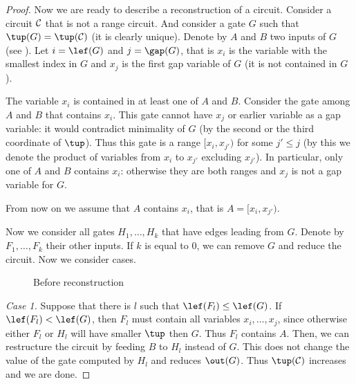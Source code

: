 \begin{proof}[Proof]
    Now we are ready to describe a reconstruction of a circuit. Consider a circuit ${\cal C}$ that is not a range circuit. And consider a gate $G$ such that $\tup(G)=\tup({\cal C})$ (it is clearly unique). Denote by $A$ and $B$ two inputs of $G$ (see ). Let $i=\lef(G)$ and $j=\gap(G)$, that is $x_i$ is the variable with the smallest index in $G$ and $x_j$ is the first gap variable of $G$ (it is not contained in $G$).

    The variable $x_i$ is contained in at least one of $A$ and $B$. Consider the gate among $A$ and $B$ that contains $x_i$. This gate cannot have $x_j$ or earlier variable as a gap variable: it would contradict minimality of $G$ (by the second or the third coordinate of $\tup$). Thus this gate is a range $[x_i,x_{j'})$ for some $j'\leq j$ (by this we denote the product of variables from $x_i$ to $x_{j'}$ excluding $x_{j'}$). In particular, only one of $A$ and $B$ contains $x_i$: otherwise they are both ranges and $x_j$ is not a gap variable for $G$.

    From now on we assume that $A$ contains $x_i$, that is $A=[x_i,x_{j'})$.

    Now we consider all gates $H_1,\ldots, H_k$ that have edges leading from $G$. Denote by $F_1,\ldots, F_k$ their other inputs. If $k$ is equal to $0$, we can remove $G$ and reduce the circuit. Now we consider cases.

    \begin{figure}[ht]
        \begin{center}
        \end{center}
        \caption{Before reconstruction} \label{fig:before}
    \end{figure}

    \emph{Case 1.} Suppose that there is $l$ such that $\lef(F_l) \leq \lef(G)$. If $\lef(F_l) < \lef(G)$, then $F_l$ must contain all variables $x_i, \ldots, x_j$, since otherwise either $F_l$ or $H_l$ will have smaller $\tup$ then $G$. Thus $F_l$ contains $A$. Then, we can restructure the circuit by feeding $B$ to $H_l$ instead of $G$. This does not change the value of the gate computed by $H_l$ and reduces $\out(G)$. Thus $\tup({\cal C})$ increases and we are done.


\end{proof}
